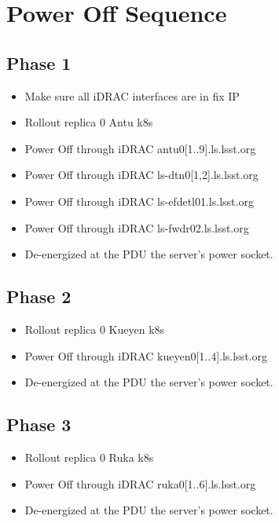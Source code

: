 \section{Power Off Sequence}
\subsection{Phase 1}
\begin{itemize}
  \item Make sure all iDRAC interfaces are in fix IP
  \item Rollout replica 0 Antu k8s
  \item Power Off through iDRAC antu0[1..9].ls.lsst.org
  \item Power Off through iDRAC ls-dtn0[1,2].ls.lsst.org
  \item Power Off through iDRAC ls-efdetl01.ls.lsst.org
  \item Power Off through iDRAC ls-fwdr02.ls.lsst.org
  \item De-energized at the PDU the server's power socket.
\end{itemize}

\newpage
\subsection{Phase 2}
\begin{itemize}
  \item Rollout replica 0 Kueyen k8s
  \item Power Off through iDRAC kueyen0[1..4].ls.lsst.org
  \item De-energized at the PDU the server's power socket.
\end{itemize}

\newpage
\subsection{Phase 3}
\begin{itemize}
  \item Rollout replica 0 Ruka k8s 
  \item Power Off through iDRAC ruka0[1..6].ls.lsst.org
  \item De-energized at the PDU the server's power socket.
\end{itemize}

